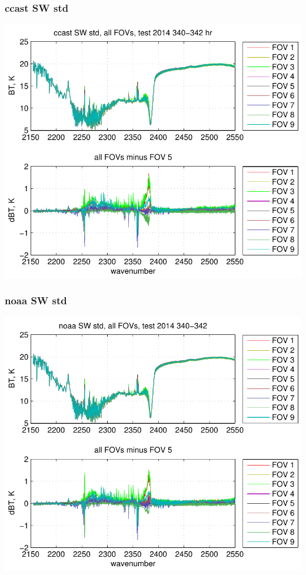 \begin{frame}
\frametitle{ccast SW std}

\begin{center}
  \includegraphics[scale=0.7]{figures/ccast_SW_std_2014_340-342_hr.pdf}
\end{center}

\end{frame}
\begin{frame}
\frametitle{noaa SW std}

\begin{center}
  \includegraphics[scale=0.7]{figures/noaa_SW_std_2014_340-342.pdf}
\end{center}

\end{frame}

